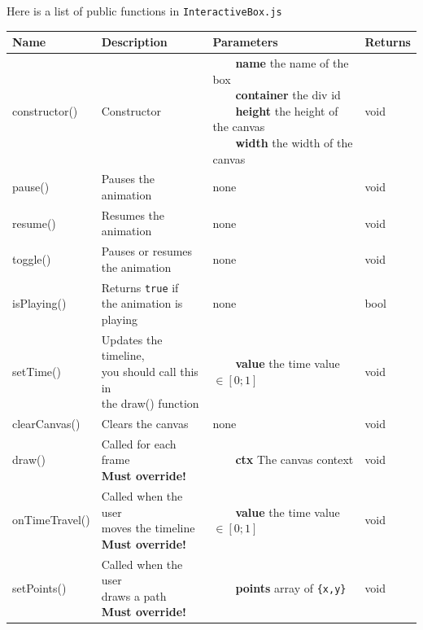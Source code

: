 \documentclass{article}
\newcommand{\tabitem}{~~\llap{\textbullet}~~}
\begin{document}
Here is a list of public functions in \texttt{InteractiveBox.js}

\bgroup{}
\def\arraystretch{1.5}
\begin{center}
    \begin{tabular}{ |l|l|l|l|}
        \hline
        \textbf{Name} & \textbf{Description} & \textbf{Parameters} & \textbf{Returns} \\
        \hline
        constructor() & Constructor &
        \makecell[l]{
            \tabitem \textbf{name} the name of the box \\
            \tabitem \textbf{container} the div id \\
            \tabitem \textbf{height} the height of the canvas \\
            \tabitem \textbf{width} the width of the canvas
        } & void \\
        \hline
        pause() & Pauses the animation & none & void \\
        \hline
        resume() & Resumes the animation & none & void \\
        \hline
        toggle() & \makecell[l]{Pauses or resumes \\ the animation} & none & void \\
        \hline
        isPlaying() &
        \makecell[l]{
            Returns \texttt{true} if \\
            the animation is playing
        } & none & bool \\
        \hline
        setTime() &
        \makecell[l]{
            Updates the timeline, \\
            you should call this in \\
            the draw() function}
        & \tabitem \textbf{value} the time value \(\in [0;1]\) & void \\
        \hline
        clearCanvas() & Clears the canvas & none & void \\
        \hline
        draw() &
        \makecell[l]{
            Called for each frame \\
            \textbf{Must override!}
        } & \tabitem \textbf{ctx} The canvas context & void \\
        \hline
        onTimeTravel() &
        \makecell[l]{
            Called when the user \\
            moves the timeline \\
            \textbf{Must override!}
        } & \tabitem \textbf{value} the time value \(\in [0;1]\) & void \\
        \hline
        setPoints() &
        \makecell[l]{
            Called when the user \\
            draws a path \\
            \textbf{Must override!}
        } & \tabitem \textbf{points} array of \texttt{\{x,y\}} & void \\
        \hline
    \end{tabular}
\end{center}
\egroup{}
\end{document}

